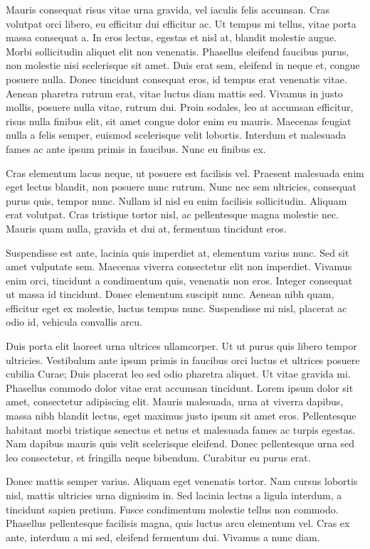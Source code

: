\documentclass{article}
\begin{document}
	Mauris consequat risus vitae urna gravida, vel iaculis felis accumsan. Cras volutpat orci libero, eu efficitur dui efficitur ac. Ut tempus mi tellus, vitae porta massa consequat a. In eros lectus, egestas et nisl at, blandit molestie augue. Morbi sollicitudin aliquet elit non venenatis. Phasellus eleifend faucibus purus, non molestie nisi scelerisque sit amet. Duis erat sem, eleifend in neque et, congue posuere nulla. Donec tincidunt consequat eros, id tempus erat venenatis vitae. Aenean pharetra rutrum erat, vitae luctus diam mattis sed. Vivamus in justo mollis, posuere nulla vitae, rutrum dui. Proin sodales, leo at accumsan efficitur, risus nulla finibus elit, sit amet congue dolor enim eu mauris. Maecenas feugiat nulla a felis semper, euismod scelerisque velit lobortis. Interdum et malesuada fames ac ante ipsum primis in faucibus. Nunc eu finibus ex.
	
	Cras elementum lacus neque, ut posuere est facilisis vel. Praesent malesuada enim eget lectus blandit, non posuere nunc rutrum. Nunc nec sem ultricies, consequat purus quis, tempor nunc. Nullam id nisl eu enim facilisis sollicitudin. Aliquam erat volutpat. Cras tristique tortor nisl, ac pellentesque magna molestie nec. Mauris quam nulla, gravida et dui at, fermentum tincidunt eros.
	
	Suspendisse est ante, lacinia quis imperdiet at, elementum varius nunc. Sed sit amet vulputate sem. Maecenas viverra consectetur elit non imperdiet. Vivamus enim orci, tincidunt a condimentum quis, venenatis non eros. Integer consequat ut massa id tincidunt. Donec elementum suscipit nunc. Aenean nibh quam, efficitur eget ex molestie, luctus tempus nunc. Suspendisse mi nisl, placerat ac odio id, vehicula convallis arcu.
	
	Duis porta elit laoreet urna ultrices ullamcorper. Ut ut purus quis libero tempor ultricies. Vestibulum ante ipsum primis in faucibus orci luctus et ultrices posuere cubilia Curae; Duis placerat leo sed odio pharetra aliquet. Ut vitae gravida mi. Phasellus commodo dolor vitae erat accumsan tincidunt. Lorem ipsum dolor sit amet, consectetur adipiscing elit. Mauris malesuada, urna at viverra dapibus, massa nibh blandit lectus, eget maximus justo ipsum sit amet eros. Pellentesque habitant morbi tristique senectus et netus et malesuada fames ac turpis egestas. Nam dapibus mauris quis velit scelerisque eleifend. Donec pellentesque urna sed leo consectetur, et fringilla neque bibendum. Curabitur eu purus erat.
	
	Donec mattis semper varius. Aliquam eget venenatis tortor. Nam cursus lobortis nisl, mattis ultricies urna dignissim in. Sed lacinia lectus a ligula interdum, a tincidunt sapien pretium. Fusce condimentum molestie tellus non commodo. Phasellus pellentesque facilisis magna, quis luctus arcu elementum vel. Cras ex ante, interdum a mi sed, eleifend fermentum dui. Vivamus a nunc diam.
	
\end{document}

